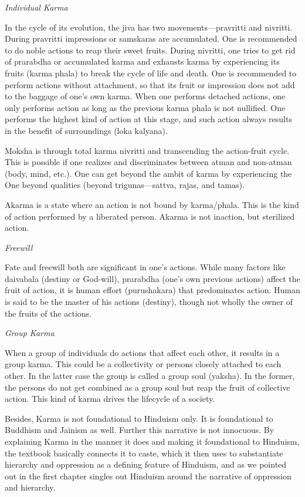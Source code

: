 \noindent
\textit{Individual Karma} 

In the cycle of its evolution, the jiva has two movements—pravritti and nivritti. During pravritti impressions or samskaras are accumulated. One is recommended to do noble actions to reap their sweet fruits. During nivritti, one tries to get rid of prarabdha or accumulated karma and exhausts karma by experiencing its fruits (karma phala) to break the cycle of life and death. One is recommended to perform actions without attachment, so that its fruit or impression does not add to the baggage of one's own karma. When one performs detached actions, one only performs action as long as the previous karma phala is not nullified. One performs the highest kind of action at this stage, and such action always results in the benefit of surroundings (loka kalyana). 

Moksha is through total karma nivritti and transcending the action-fruit cycle. This is possible if one realizes and discriminates between atman and non-atman (body, mind, etc.). One can get beyond the ambit of karma by experiencing the One beyond qualities (beyond trigunas—sattva, rajas, and tamas).

Akarma is a state where an action is not bound by karma/phala. This is the kind of action performed by a liberated person. Akarma is not inaction, but sterilized action.

\noindent
\textit{Freewill} 

Fate and freewill both are significant in one's actions. While many factors like daivabala (destiny or God-will), prarabdha (one's own previous actions) affect the fruit of action, it is human effort (purushakara) that predominates action. Human is said to be the master of his actions (destiny), though not wholly the owner of the fruits of the actions.

\noindent
\textit{Group Karma} 

When a group of individuals do actions that affect each other, it results in a group karma. This could be a collectivity or persons closely attached to each other. In the latter case the group is called a group soul (yaksha). In the former, the persons do not get combined as a group soul but reap the fruit of collective action. This kind of karma drives the lifecycle of a society.

Besides, Karma is not foundational to Hinduism only. It is foundational to Buddhism and Jainism as well. Further this narrative is not innocuous. By explaining Karma in the manner it does and making it foundational to Hinduism, the textbook basically connects it to caste, which it then uses to substantiate hierarchy and oppression as a defining feature of Hinduism, and as we pointed out in the first chapter singles out Hinduism around the narrative of oppression and hierarchy.


